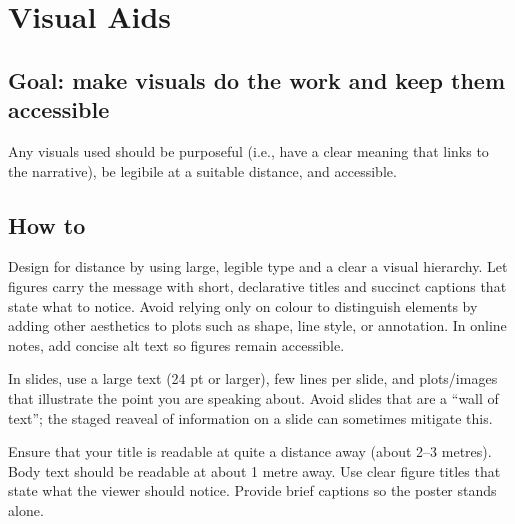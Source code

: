 \documentclass[
  a4paper,
  DIV=11,
  numbers=noendperiod,
  oneside]{scrreprt}
\begin{document}
\section{Visual Aids}\label{sec-pres-visual-aids}

\subsection{Goal: make visuals do the work and keep them
accessible}\label{goal-make-visuals-do-the-work-and-keep-them-accessible}

Any visuals used should be purposeful (i.e., have a clear meaning that
links to the narrative), be legibile at a suitable distance, and
accessible.

\subsection{How to}\label{how-to-9}

Design for distance by using large, legible type and a clear a visual
hierarchy. Let figures carry the message with short, declarative titles
and succinct captions that state what to notice. Avoid relying only on
colour to distinguish elements by adding other aesthetics to plots such
as shape, line style, or annotation. In online notes, add concise alt
text so figures remain accessible.

\begin{tcolorbox}[enhanced jigsaw, colframe=quarto-callout-note-color-frame, title=\textcolor{quarto-callout-note-color}{\faInfo}\hspace{0.5em}{Talk Visual Aids}, breakable, opacityback=0, titlerule=0mm, colbacktitle=quarto-callout-note-color!10!white, toptitle=1mm, colback=white, coltitle=black, toprule=.15mm, bottomtitle=1mm, left=2mm, arc=.35mm, rightrule=.15mm, bottomrule=.15mm, opacitybacktitle=0.6, leftrule=.75mm]

In slides, use a large text (24 pt or larger), few lines per slide, and
plots/images that illustrate the point you are speaking about. Avoid
slides that are a ``wall of text''; the staged reaveal of information on
a slide can sometimes mitigate this.

\end{tcolorbox}

\begin{tcolorbox}[enhanced jigsaw, colframe=quarto-callout-note-color-frame, title=\textcolor{quarto-callout-note-color}{\faInfo}\hspace{0.5em}{Poster Visual Aids}, breakable, opacityback=0, titlerule=0mm, colbacktitle=quarto-callout-note-color!10!white, toptitle=1mm, colback=white, coltitle=black, toprule=.15mm, bottomtitle=1mm, left=2mm, arc=.35mm, rightrule=.15mm, bottomrule=.15mm, opacitybacktitle=0.6, leftrule=.75mm]

Ensure that your title is readable at quite a distance away (about 2--3
metres). Body text should be readable at about 1 metre away. Use clear
figure titles that state what the viewer should notice. Provide brief
captions so the poster stands alone.

\end{tcolorbox}
\end{document}
